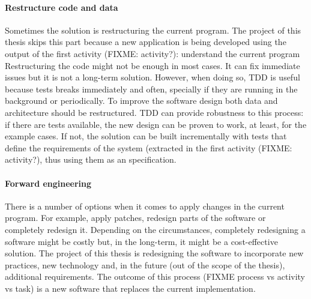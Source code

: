 \paragraph{Restructure code and data}
Sometimes the solution is restructuring the current program.
The project of this thesis skips this part because a new application is being developed using the output of the first activity (FIXME: activity?): understand the current program
Restructuring the code might not be enough in most cases. 
It can fix immediate issues but it is not a long-term solution.
However, when doing so, \ac{TDD} is useful because tests breaks immediately and often, specially if they are running in the background or periodically.
To improve the software design both data and architecture should be restructured.
\ac{TDD} can provide robustness to this process: if there are tests available, the new design can be proven to work, at least, for the example cases. 
If not, the solution can be built incrementally with tests that define the requirements of the system (extracted in the first activity (FIXME: activity?), thus using them as an specification.

\paragraph{Forward engineering}
There is a number of options when it comes to apply changes in the current program. 
For example, apply patches, redesign parts of the software or completely redesign it.
Depending on the circumstances, completely redesigning a software might be costly but, in the long-term, it might be a cost-effective solution.
The project of this thesis is redesigning the software to incorporate new practices, new technology and, in the future (out of the scope of the thesis), additional requirements.
The outcome of this process (FIXME process vs activity vs task) is a new software that replaces the current implementation.




